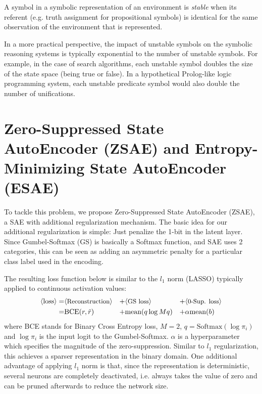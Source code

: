 \begin{defi}
A symbol in a symbolic representation of an environment is \emph{stable}
when its referent (e.g. truth assignment for propositional symbols) is identical
for the same observation of the environment that is represented.
\end{defi}

In a more practical perspective, 
the impact of unstable symbols on the symbolic reasoning systems is typically exponential to the number of unstable symbols.
For example, in the case of search algorithms, each unstable symbol doubles the size of the state space (being true or false).
In a hypothetical Prolog-like logic programming system, each unstable predicate symbol would also double the
number of unifications.


\section{Zero-Suppressed State AutoEncoder (ZSAE) and Entropy-Minimizing State AutoEncoder (ESAE)}
\label{zsae}

To tackle this problem, we propose Zero-Suppressed State AutoEncoder (ZSAE),
a SAE with additional regularization mechanism.
The basic idea for our additional regularization is simple: Just penalize the
1-bit in the latent layer. Since Gumbel-Softmax (GS) is basically a Softmax function,
and SAE uses 2 categories, this can be seen as adding an
asymmetric penalty for a particular class label used in the encoding.

The resulting loss function below is similar to the $l_1$ norm (LASSO) typically
applied to continuous activation values:
\begin{align*}
 \brackets{\text{loss}} = & \brackets{\text{\small Reconstruction}} &+ & \brackets{\text{\small GS loss}} &+ & \brackets{\text{\small 0-Sup. loss}} \\ 
 =                        & \text{BCE}(r,\tilde{r})     &+ & \text{mean}(q \log Mq)           &+ & \alpha \text{mean}(b)
\end{align*}
where BCE stands for Binary Cross Entropy loss,
$M=2$, $q=\text{Softmax}(\log \pi_i)$ and $\log \pi_i$ is the input logit to the Gumbel-Softmax.
$\alpha$ is a hyperparameter which specifies the magnitude of the zero-suppression.
Similar to $l_1$ regularization, this achieves a sparser representation in the binary domain.
One additional advantage of applying $l_1$ norm is that, since the representation is deterministic,
several neurons are completely deactivated, i.e. always takes the value of zero
and can be pruned afterwards to reduce the network size.

